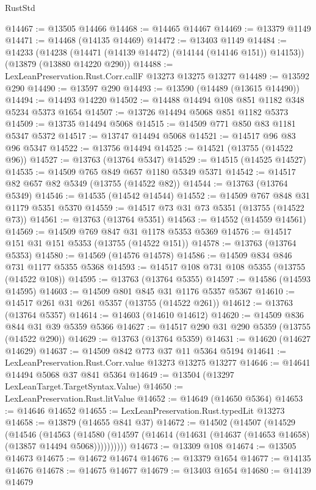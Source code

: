 \begin{lexlean}{RustStd}
\begin{coremodule}
@14467 := @13505 @14466
@14468 := @14465 @14467
@14469 := @13379 @1149
@14471 := @14468 (@14135 @14469)
@14472 := @13403 @1149
@14484 := @14233
    (@14238 (@14471 (@14139 @14472) (@14144 (@14146 @151)) @14153))
    (@13879 (@13880 @14220 @290))
@14488 := LexLeanPreservation.Rust.Corr.callF @13273 @13275 @13277
@14489 := @13592 @290
@14490 := @13597 @290
@14493 := @13590 (@14489 (@13615 @14490))
@14494 := @14493 @14220
@14502 := @14488 @14494 @108 @851 @1182 @348 @5234 @5373 @1654
@14507 := @13726 @14494 @5068 @851 @1182 @5373
@14509 := @13735 @14494 @5068
@14515 := @14509 @771 @850 @83 @1181 @5347 @5372
@14517 := @13747 @14494 @5068
@14521 := @14517 @96 @83 @96 @5347
@14522 := @13756 @14494
@14525 := @14521 (@13755 (@14522 @96))
@14527 := @13763 (@13764 @5347)
@14529 := @14515 (@14525 @14527)
@14535 := @14509 @765 @849 @657 @1180 @5349 @5371
@14542 := @14517 @82 @657 @82 @5349 (@13755 (@14522 @82))
@14544 := @13763 (@13764 @5349)
@14546 := @14535 (@14542 @14544)
@14552 := @14509 @767 @848 @31 @1179 @5351 @5370
@14559 := @14517 @73 @31 @73 @5351 (@13755 (@14522 @73))
@14561 := @13763 (@13764 @5351)
@14563 := @14552 (@14559 @14561)
@14569 := @14509 @769 @847 @31 @1178 @5353 @5369
@14576 := @14517 @151 @31 @151 @5353 (@13755 (@14522 @151))
@14578 := @13763 (@13764 @5353)
@14580 := @14569 (@14576 @14578)
@14586 := @14509 @834 @846 @731 @1177 @5355 @5368
@14593 := @14517 @108 @731 @108 @5355 (@13755 (@14522 @108))
@14595 := @13763 (@13764 @5355)
@14597 := @14586 (@14593 @14595)
@14603 := @14509 @801 @845 @31 @1176 @5357 @5367
@14610 := @14517 @261 @31 @261 @5357 (@13755 (@14522 @261))
@14612 := @13763 (@13764 @5357)
@14614 := @14603 (@14610 @14612)
@14620 := @14509 @836 @844 @31 @39 @5359 @5366
@14627 := @14517 @290 @31 @290 @5359 (@13755 (@14522 @290))
@14629 := @13763 (@13764 @5359)
@14631 := @14620 (@14627 @14629)
@14637 := @14509 @842 @773 @37 @11 @5364 @5194
@14641 := LexLeanPreservation.Rust.Corr.value @13273 @13275 @13277
@14646 := @14641 @14494 @5068 @37 @841 @5364
@14649 := @13504 (@13297 LexLeanTarget.TargetSyntax.Value)
@14650 := LexLeanPreservation.Rust.litValue
@14652 := @14649 (@14650 @5364)
@14653 := @14646 @14652
@14655 := LexLeanPreservation.Rust.typedLit @13273
@14658 := @13879 (@14655 @841 @37)
@14672 := @14502
    (@14507
      (@14529
        (@14546
          (@14563
            (@14580 (@14597 (@14614 (@14631 (@14637 (@14653 @14658) (@13857 @14494 @5068))))))))))
@14673 := @13309 @108
@14674 := @13505 @14673
@14675 := @14672 @14674
@14676 := @13379 @1654
@14677 := @14135 @14676
@14678 := @14675 @14677
@14679 := @13403 @1654
@14680 := @14139 @14679

\end{coremodule}
\end{lexlean}
